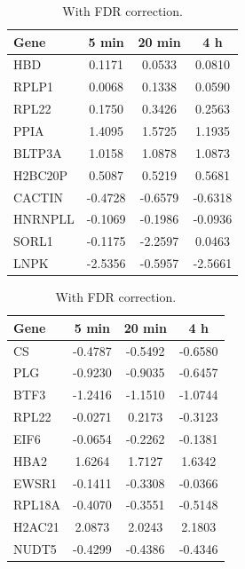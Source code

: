 \documentclass{article}
\begin{document}
      \begin{table}[H]
        \centering
        \caption{Top 30 genes Z-score standardization results (with and without FDR correction).}
        \label{tab:zscore_compare}

        \begin{subtable}[t]{0.48\textwidth}
            \centering
            \caption{Without FDR correction.}
            \begin{tabular}{@{}lccc@{}}
              \toprule
              \textbf{Gene} & \textbf{5 min} & \textbf{20 min} & \textbf{4 h} \\ \midrule
              HBD     & 0.1171 & 0.0533 & 0.0810 \\
              RPLP1   & 0.0068 & 0.1338 & 0.0590 \\
              RPL22   & 0.1750 & 0.3426 & 0.2563 \\
              PPIA    & 1.4095 & 1.5725 & 1.1935 \\
              BLTP3A  & 1.0158 & 1.0878 & 1.0873 \\
              H2BC20P & 0.5087 & 0.5219 & 0.5681 \\
              CACTIN  & -0.4728 & -0.6579 & -0.6318 \\
              HNRNPLL & -0.1069 & -0.1986 & -0.0936 \\
              SORL1   & -0.1175 & -2.2597 & 0.0463 \\
              LNPK    & -2.5356 & -0.5957 & -2.5661 \\ \bottomrule
            \end{tabular}
            \label{tab:zscore_raw}
        \end{subtable}
        \hfill
        \begin{subtable}[t]{0.48\textwidth}
            \centering
            \caption{With FDR correction.}
            \begin{tabular}{@{}lccc@{}}
              \toprule
              \textbf{Gene} & \textbf{5 min} & \textbf{20 min} & \textbf{4 h} \\ \midrule
              CS     & -0.4787 & -0.5492 & -0.6580 \\
              PLG    & -0.9230 & -0.9035 & -0.6457 \\
              BTF3   & -1.2416 & -1.1510 & -1.0744 \\
              RPL22  & -0.0271 & 0.2173  & -0.3123 \\
              EIF6   & -0.0654 & -0.2262 & -0.1381 \\
              HBA2   & 1.6264  & 1.7127  & 1.6342 \\
              EWSR1  & -0.1411 & -0.3308 & -0.0366 \\
              RPL18A & -0.4070 & -0.3551 & -0.5148 \\
              H2AC21 & 2.0873  & 2.0243  & 2.1803 \\
              NUDT5  & -0.4299 & -0.4386 & -0.4346 \\ \bottomrule
            \end{tabular}
            \label{tab:zscore_fdr}
        \end{subtable}
    \end{table}
      
\end{document}
